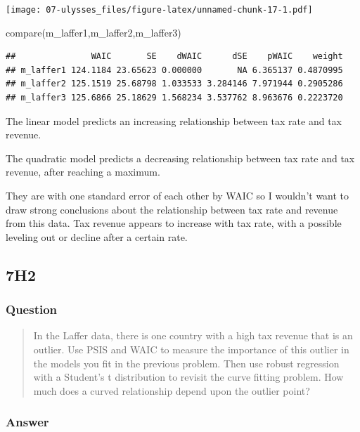 \documentclass[
]{book}
\newenvironment{Shaded}{\begin{snugshade}}{\end{snugshade}}
\newcommand{\FunctionTok}[1]{\textcolor[rgb]{0.00,0.00,0.00}{#1}}
\newcommand{\NormalTok}[1]{#1}
\begin{document}
\texttt{[image: 07-ulysses\_files/figure-latex/unnamed-chunk-17-1.pdf]}

\begin{Shaded}
\begin{Highlighting}[]
\FunctionTok{compare}\NormalTok{(m\_laffer1,m\_laffer2,m\_laffer3)}
\end{Highlighting}
\end{Shaded}

\begin{verbatim}
##               WAIC       SE    dWAIC      dSE    pWAIC    weight
## m_laffer1 124.1184 23.65623 0.000000       NA 6.365137 0.4870995
## m_laffer2 125.1519 25.68798 1.033533 3.284146 7.971944 0.2905286
## m_laffer3 125.6866 25.18629 1.568234 3.537762 8.963676 0.2223720
\end{verbatim}

The linear model predicts an increasing relationship between tax rate and tax revenue.

The quadratic model predicts a decreasing relationship between tax rate and tax revenue, after reaching a maximum.

They are with one standard error of each other by WAIC so I wouldn't want to draw strong conclusions about the relationship between tax rate and revenue from this data. Tax revenue appears to increase with tax rate, with a possible leveling out or decline after a certain rate.

\hypertarget{h2-3}{%
\subsection*{7H2}\label{h2-3}}

\hypertarget{question-71}{%
\subsubsection*{Question}\label{question-71}}

\begin{quote}
In the Laffer data, there is one country with a high tax revenue that is an outlier. Use PSIS and WAIC to measure the importance of this outlier in the models you fit in the previous problem. Then use robust regression with a Student's t distribution to revisit the curve fitting problem. How much does a curved relationship depend upon the outlier point?
\end{quote}

\hypertarget{answer-71}{%
\subsubsection*{Answer}\label{answer-71}}
\end{document}
